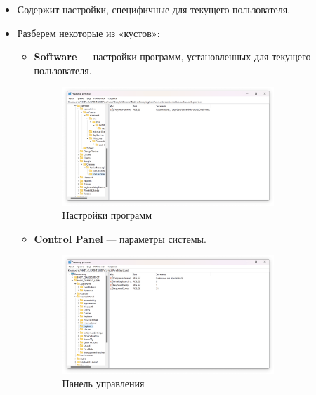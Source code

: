 \documentclass[a4paper, 14pt]{report}
\begin{document}
\begin{enumerate}
{          \begin{itemize}
              \item Содержит настройки, специфичные для текущего пользователя.
              \item {Разберем некоторые из «кустов»:
                    \begin{itemize}
                        \item {\textbf{Software} — настройки программ, установленных для текущего пользователя.
                              \begin{figure}[H]
                                  \centering
                                  \includegraphics[width=0.8\textwidth]{../images/HKCU_software.png}
                                  \caption{Настройки программ}
                              \end{figure}
                              }
                        \item {\textbf{Control Panel} — параметры системы.
                              \begin{figure}[H]
                                  \centering
                                  \includegraphics[width=0.8\textwidth]{../images/HKCU_control.png}
                                  \caption{Панель управления}
                              \end{figure}
                              }

\end{itemize}}
\end{itemize}}
\end{enumerate}
\end{document}
